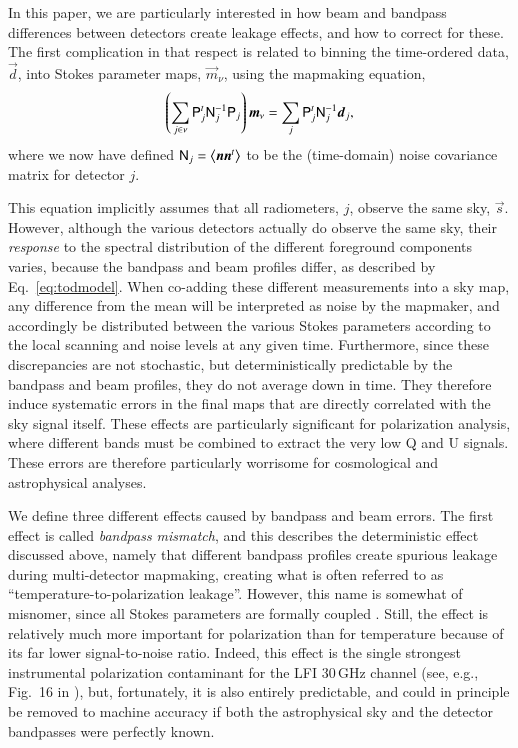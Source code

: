 \documentclass[twocolumn]{aa}
\renewcommand{\d}[0]{\vec{d}}
\newcommand{\n}[0]{\vec{n}}
\newcommand{\s}[0]{\vec{s}}
\newcommand{\m}[0]{\vec{m}}
\newcommand{\N}[0]{\tens{N}}
\renewcommand{\P}[0]{\tens{P}}
\newcommand{\?}[1]{\textcolor{red}{{\bf [#1]}}}
\begin{document}
In this paper, we are particularly interested in how beam and bandpass
differences between detectors create leakage effects, and how to correct for
these. The first complication in that respect is related to binning the
time-ordered data, $\d$, into Stokes parameter maps, $\m_\nu$, using the mapmaking
equation,
\begin{equation}
  \left(\sum_{j \in \nu} \P_j^t \N_{j}^{-1} \P_j\right) \m_{\nu} =
  \sum_j \P_j^t \N_j^{-1}\d_j,
  \label{eq:binmap}
  \end{equation}
where we now have defined $\N_j=\left<\n\n^t\right>$ to be the
(time-domain) noise covariance matrix for detector $j$. 

This equation implicitly assumes that all radiometers, $j$, observe the same
sky, $\s$. However, although the various detectors actually do observe the same
sky, their \emph{response} to the spectral distribution of the different
foreground components varies, because the bandpass and beam profiles differ, as
described by Eq.~\eqref{eq:todmodel}. When co-adding these different
measurements into a sky map, any difference from the mean will be interpreted as
noise by the mapmaker, and accordingly be distributed between the various Stokes
parameters according to the local scanning and noise levels at any given time.
Furthermore, since these discrepancies are not stochastic, but deterministically
predictable by the bandpass and beam profiles, they do not average down in time.
They therefore induce systematic errors in the final maps that are directly
correlated with the sky signal itself. These effects are particularly
significant for polarization analysis, where different bands must be combined to
extract the very low Q and U signals. These errors are therefore particularly
worrisome for cosmological and astrophysical analyses.

We define three different effects caused by bandpass and beam
errors. The first effect is called \textit{bandpass mismatch}, and
this describes the deterministic effect discussed above, namely that
different bandpass profiles create spurious leakage during
multi-detector mapmaking, creating what is often referred to as
``temperature-to-polarization leakage''. However, this name is
somewhat of misnomer, since all Stokes parameters are formally coupled
\citep[see, e.g.,][]{npipe}.  Still, the effect is relatively much
more important for polarization than for temperature because of its
far lower signal-to-noise ratio. Indeed, this effect is the single
strongest instrumental polarization contaminant for the LFI 30\,GHz
channel (see, e.g., Fig.~16 in \citealp{bp01}), but, fortunately, it
is also entirely predictable, and could in principle be removed to machine
accuracy if both the astrophysical sky and the detector bandpasses
were perfectly known.
\end{document}
